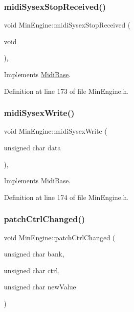 \subsubsection{\texorpdfstring{midi\+Sysex\+Stop\+Received()}{midiSysexStopReceived()}}
{\footnotesize\ttfamily void Min\+Engine\+::midi\+Sysex\+Stop\+Received (\begin{DoxyParamCaption}\item[{void}]{ }\end{DoxyParamCaption})\hspace{0.3cm}{\ttfamily [inline]}, {\ttfamily [virtual]}}



Implements \hyperlink{class_midi_base_a14d11f47e731a26535f855a99893d092}{Midi\+Base}.



Definition at line 173 of file Min\+Engine.\+h.

\mbox{\label{class_min_engine_a10593d7e2c9bc02a3cffa92a522da294}} 
\subsubsection{\texorpdfstring{midi\+Sysex\+Write()}{midiSysexWrite()}}
{\footnotesize\ttfamily void Min\+Engine\+::midi\+Sysex\+Write (\begin{DoxyParamCaption}\item[{unsigned char}]{data }\end{DoxyParamCaption})\hspace{0.3cm}{\ttfamily [inline]}, {\ttfamily [virtual]}}



Implements \hyperlink{class_midi_base_a747dece3a9e16a13766073d9e675887b}{Midi\+Base}.



Definition at line 174 of file Min\+Engine.\+h.

\mbox{\label{class_min_engine_ad26e5e985eb56946ae93dc3274874229}} 
\subsubsection{\texorpdfstring{patch\+Ctrl\+Changed()}{patchCtrlChanged()}}
{\footnotesize\ttfamily void Min\+Engine\+::patch\+Ctrl\+Changed (\begin{DoxyParamCaption}\item[{unsigned char}]{bank,  }\item[{unsigned char}]{ctrl,  }\item[{unsigned char}]{new\+Value }\end{DoxyParamCaption})\hspace{0.3cm}{\ttfamily [virtual]}}



